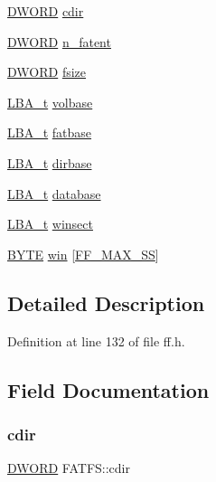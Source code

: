 \begin{DoxyCompactItemize}
\item 
\hyperlink{ff_8h_ad342ac907eb044443153a22f964bf0af}{D\+W\+O\+RD} \hyperlink{structFATFS_a217d0ce0c8cec84aa7f0c142679412c6}{cdir}
\item 
\hyperlink{ff_8h_ad342ac907eb044443153a22f964bf0af}{D\+W\+O\+RD} \hyperlink{structFATFS_a8da50eeba6469bc20d60ca0cf9a1307c}{n\+\_\+fatent}
\item 
\hyperlink{ff_8h_ad342ac907eb044443153a22f964bf0af}{D\+W\+O\+RD} \hyperlink{structFATFS_a53e9560659f14e66f306c2c444198bf3}{fsize}
\item 
\hyperlink{ff_8h_a1f3c30a83148a28340f009d4e583f087}{L\+B\+A\+\_\+t} \hyperlink{structFATFS_a89358c0e7b2293254c9481dcd2984d30}{volbase}
\item 
\hyperlink{ff_8h_a1f3c30a83148a28340f009d4e583f087}{L\+B\+A\+\_\+t} \hyperlink{structFATFS_a78b1024e7d7d086d132a58ee943b31df}{fatbase}
\item 
\hyperlink{ff_8h_a1f3c30a83148a28340f009d4e583f087}{L\+B\+A\+\_\+t} \hyperlink{structFATFS_afc8c3d5d8408b70379f23382c6e28168}{dirbase}
\item 
\hyperlink{ff_8h_a1f3c30a83148a28340f009d4e583f087}{L\+B\+A\+\_\+t} \hyperlink{structFATFS_a4ce7c10569f45fae1c709c9ee41f69cb}{database}
\item 
\hyperlink{ff_8h_a1f3c30a83148a28340f009d4e583f087}{L\+B\+A\+\_\+t} \hyperlink{structFATFS_aaf7eccaccdc9c4243230672d6b2f6566}{winsect}
\item 
\hyperlink{ff_8h_a4ae1dab0fb4b072a66584546209e7d58}{B\+Y\+TE} \hyperlink{structFATFS_a49e9c5c3ae9c13755242b6ce5748ecb1}{win} \mbox{[}\hyperlink{ffconf_8h_a104c36ee46f9d6e76dadf37f3d9696cc}{F\+F\+\_\+\+M\+A\+X\+\_\+\+SS}\mbox{]}
\end{DoxyCompactItemize}


\subsection{Detailed Description}


Definition at line 132 of file ff.\+h.



\subsection{Field Documentation}
\mbox{\label{structFATFS_a217d0ce0c8cec84aa7f0c142679412c6}} 
\subsubsection{\texorpdfstring{cdir}{cdir}}
{\footnotesize\ttfamily \hyperlink{ff_8h_ad342ac907eb044443153a22f964bf0af}{D\+W\+O\+RD} F\+A\+T\+F\+S\+::cdir}



